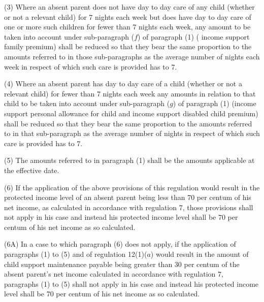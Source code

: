 \documentclass[12pt,a4paper]{article}
\begin{document}
(3) Where an absent parent does not have day to day care of any child (whether or not a relevant child) for 7 nights each week but does have day to day care of one or more such children for fewer than 7 nights each week, 
any amount  %
to be taken into account under 
sub-paragraph ($f$)  %
of paragraph (1) (%
income support family premium) shall be reduced so that they bear the same proportion to the amounts referred to in those sub-paragraphs as the average number of nights each week in respect of which such care is provided has to 7.

(4) Where an absent parent has day to day care of a child (whether or not a relevant child) for fewer than 7 nights each week any amounts in relation to that child to be taken into account under sub-paragraph ($g$) of paragraph (1) (income support personal allowance for child and income support disabled child premium) shall be reduced so that they bear the same proportion to the amounts referred to in that sub-paragraph as the average number of nights in respect of which such care is provided has to 7.

(5) The amounts referred to in paragraph (1) shall be the amounts applicable at the effective date.

(6) If the application of the above provisions of this regulation would result in the protected income level of an absent parent being less than 70 per centum of his net income, as calculated in accordance with regulation 7, those provisions shall not apply in his case and instead his protected income level shall be 70 per centum of his net income as so calculated.

(6A) In a case to which paragraph (6) does not apply, if the application of paragraphs (1) to (5) and of regulation 12(1)($a$) would result in the amount of child support maintenance payable being greater than 30 per centum of the absent parent’s net income calculated in accordance with regulation 7, paragraphs (1) to (5) shall not apply in his case and instead his protected income level shall be 70 per centum of his net income as so calculated.
\end{document}
